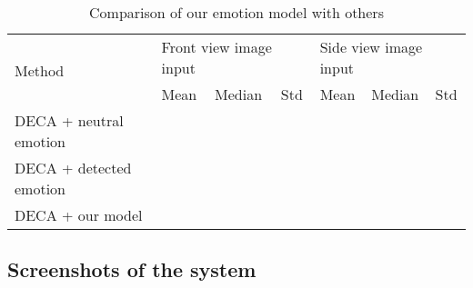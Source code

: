 \begin{table}[H]
    \centering
    \captionsetup{font=bf}
    \caption{Comparison of our emotion model with others}
    \begin{tabularx}{\linewidth}{|X|XXX|XXX|}
        \hline
        \multirow{2}{*}{Method} & \multicolumn{3}{l|}{Front view image input} & \multicolumn{3}{l|}{Side view image input}                                                                       \\ \cline{2-7}
                                & \multicolumn{1}{l|}{Mean}                   & \multicolumn{1}{l|}{Median}                & Std & \multicolumn{1}{l|}{Mean} & \multicolumn{1}{l|}{Median} & Std \\ \hline
        DECA + neutral emotion  & \multicolumn{1}{l|}{}                       & \multicolumn{1}{l|}{}                      &     & \multicolumn{1}{l|}{}     & \multicolumn{1}{l|}{}       &     \\ \hline
        DECA + detected emotion & \multicolumn{1}{l|}{}                       & \multicolumn{1}{l|}{}                      &     & \multicolumn{1}{l|}{}     & \multicolumn{1}{l|}{}       &     \\ \hline
        DECA + our model        & \multicolumn{1}{l|}{}                       & \multicolumn{1}{l|}{}                      &     & \multicolumn{1}{l|}{}     & \multicolumn{1}{l|}{}       &     \\ \hline
    \end{tabularx}
    \label{loss_stats}
\end{table}


\subsection{Screenshots of the system}